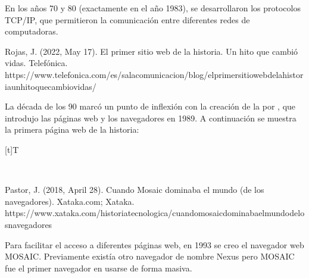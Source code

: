 \documentclass[letterpaper,10pt,spanish]{sphinxmanual}
\let\sphinxpxdimen\pdfpxdimen\else\newdimen\sphinxpxdimen
\begin{document}
\sphinxAtStartPar
En los años 70 y 80 (exactamente en el año 1983), se desarrollaron los protocolos TCP/IP, que permitieron la comunicación entre diferentes redes de computadoras.

\sphinxAtStartPar
%
\begin{footnote}[2]\sphinxAtStartFootnote
Rojas, J. (2022, May 17). El primer sitio web de la historia. Un hito que cambió vidas. Telefónica. https://www.telefonica.com/es/sala\sphinxhyphen{}comunicacion/blog/el\sphinxhyphen{}primer\sphinxhyphen{}sitio\sphinxhyphen{}web\sphinxhyphen{}de\sphinxhyphen{}la\sphinxhyphen{}historia\sphinxhyphen{}un\sphinxhyphen{}hito\sphinxhyphen{}que\sphinxhyphen{}cambio\sphinxhyphen{}vidas/
%
\end{footnote} La década de los 90 marcó un punto de inflexión con la creación de la  por , que introdujo las páginas web y los navegadores en 1989. A continuación se muestra la primera página web de la historia:


\begin{savenotes}\sphinxattablestart
\sphinxthistablewithglobalstyle
\centering
\begin{tabulary}{\linewidth}[t]{T}
\sphinxtoprule
\sphinxtableatstartofbodyhook

\begin{sphinxfigure-in-table}
\centering
\capstart
\noindent\sphinxincludegraphics[width=700\sphinxpxdimen]{{image02}.png}
\label{\detokenize{1_guias/10informatica/G1001:id27}}\end{sphinxfigure-in-table}\relax
\\
\sphinxbottomrule
\end{tabulary}
\sphinxtableafterendhook\par
\sphinxattableend\end{savenotes}

\sphinxAtStartPar
%
\begin{footnote}[3]\sphinxAtStartFootnote
Pastor, J. (2018, April 28). Cuando Mosaic dominaba el mundo (de los navegadores). Xataka.com; Xataka. https://www.xataka.com/historia\sphinxhyphen{}tecnologica/cuando\sphinxhyphen{}mosaic\sphinxhyphen{}dominaba\sphinxhyphen{}el\sphinxhyphen{}mundo\sphinxhyphen{}de\sphinxhyphen{}los\sphinxhyphen{}navegadores
%
\end{footnote} Para facilitar el acceso a diferentes páginas web, en 1993 se creo el navegador web MOSAIC. Previamente existía otro navegador de nombre Nexus pero MOSAIC fue el primer navegador en usarse de forma masiva.
\end{document}
